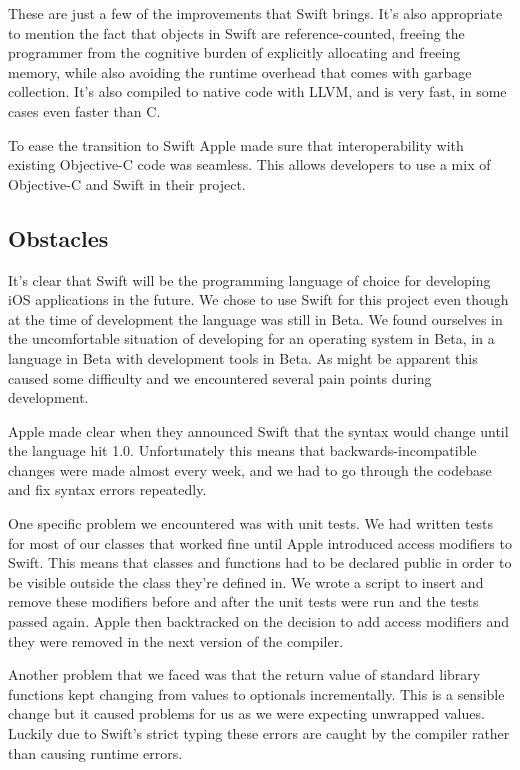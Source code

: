 \documentclass[pdftex, DIV=calc, paper=a4, fontsize=11pt]{scrartcl}	 %
\begin{document}
These are just a few of the improvements that Swift brings. It's also appropriate to mention the fact
that objects in Swift are reference-counted, freeing the programmer from the cognitive burden of
explicitly allocating and freeing memory, while also avoiding the runtime overhead that comes with
garbage collection. It's also compiled to native code with LLVM\cite{llvm}, and is very fast, in some cases even
faster than C.

To ease the transition to Swift Apple made sure that interoperability with existing Objective-C 
code was seamless. This allows developers to use a mix of Objective-C and Swift in their project.

\subsection{Obstacles}

It's clear that Swift will be the programming language of choice for developing iOS applications
in the future. We chose to use Swift for this project even though at the time of development the
language was still in Beta. We found ourselves in the uncomfortable situation of developing for an
operating system in Beta, in a language in Beta with development tools in Beta. As might be apparent
this caused some difficulty and we encountered several pain points during development.

Apple made clear when they announced Swift that the syntax would change until the language hit 1.0.
Unfortunately this means that backwards-incompatible changes were made almost every week, and we had
to go through the codebase and fix syntax errors repeatedly.

One specific problem we encountered was with unit tests. We had written tests for most of our classes
that worked fine until Apple introduced access modifiers to Swift. This means that classes and 
functions had to be declared public in order to be visible outside the class they're defined in. We
wrote a script to insert and remove these modifiers before and after the unit tests were run and
the tests passed again. Apple then backtracked on the decision to add access modifiers and they were
removed in the next version of the compiler. 

Another problem that we faced was that the return value of standard library functions kept changing
from values to optionals incrementally. This is a sensible change but it caused problems for us as
we were expecting unwrapped values. Luckily due to Swift's strict typing these errors are caught by
the compiler rather than causing runtime errors.
\end{document}

